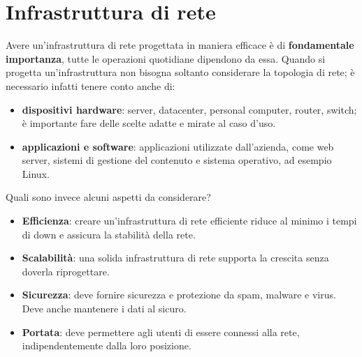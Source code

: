 \section{Infrastruttura di rete}
Avere un'infrastruttura di rete progettata in maniera efficace è di \textbf{fondamentale importanza}, tutte le operazioni quotidiane dipendono da essa. Quando si progetta un'infrastruttura non bisogna soltanto considerare la topologia di rete; è necessario infatti tenere conto anche di:
\begin{itemize}
    \item \textbf{dispositivi hardware}: server, datacenter, personal computer, router, switch; è importante fare delle scelte adatte e mirate al caso d'uso.
    \item \textbf{applicazioni e software}: applicazioni utilizzate dall'azienda, come web server, sistemi di gestione del contenuto e sistema operativo, ad esempio Linux. 
\end{itemize}


Quali sono invece alcuni aspetti da considerare? 
\begin{itemize}
    \item \textbf{Efficienza}: creare un'infrastruttura di rete efficiente riduce al minimo i tempi di down e assicura la stabilità della rete.
    \item \textbf{Scalabilità}: una solida infrastruttura di rete supporta la crescita senza doverla riprogettare.
    \item \textbf{Sicurezza}: deve fornire sicurezza e protezione da spam, malware e virus. Deve anche mantenere i dati al sicuro.
    \item \textbf{Portata}: deve permettere agli utenti di essere connessi alla rete, indipendentemente dalla loro posizione.
\end{itemize}


